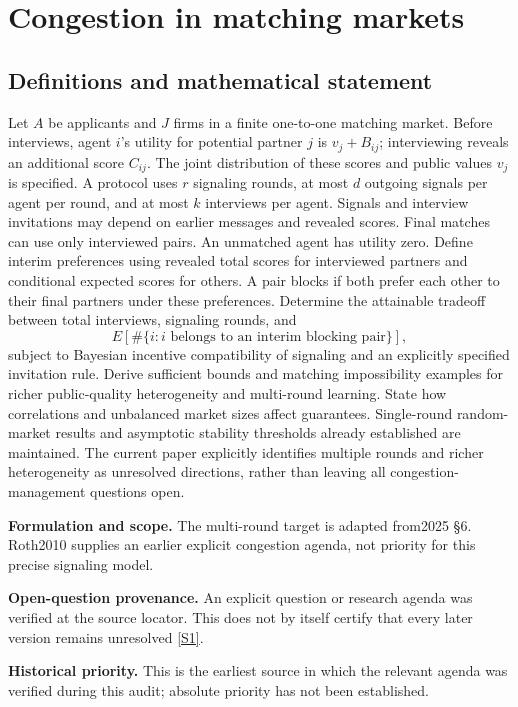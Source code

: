 \documentclass[11pt]{article}
\newcommand{\sref}[2]{\hyperlink{source:#1:#2}{[S#2]}}
\begin{document}
\section*{Congestion in matching markets}\label{30007579}
\subsection{Definitions and mathematical statement}
Let \(A\) be applicants and \(J\) firms in a finite one-to-one matching market. Before interviews, agent \(i\)'s utility for potential partner \(j\) is \(v_j+B_{ij}\); interviewing reveals an additional score \(C_{ij}\). The joint distribution of these scores and public values \(v_j\) is specified. A protocol uses \(r\) signaling rounds, at most \(d\) outgoing signals per agent per round, and at most \(k\) interviews per agent. Signals and interview invitations may depend on earlier messages and revealed scores. Final matches can use only interviewed pairs. An unmatched agent has utility zero. Define interim preferences using revealed total scores for interviewed partners and conditional expected scores for others. A pair blocks if both prefer each other to their final partners under these preferences. Determine the attainable tradeoff between total interviews, signaling rounds, and
\[
 E[\#\{i:i\text{ belongs to an interim blocking pair}\}],
\]
subject to Bayesian incentive compatibility of signaling and an explicitly specified invitation rule. Derive sufficient bounds and matching impossibility examples for richer public-quality heterogeneity and multi-round learning. State how correlations and unbalanced market sizes affect guarantees. Single-round random-market results and asymptotic stability thresholds already established are maintained. The current paper explicitly identifies multiple rounds and richer heterogeneity as unresolved directions, rather than leaving all congestion-management questions open.

\par\textbf{Formulation and scope.} The multi-round target is adapted from2025 §6. Roth2010 supplies an earlier explicit congestion agenda, not priority for this precise signaling model.

\par\textbf{Open-question provenance.} An explicit question or research agenda was verified at the source locator. This does not by itself certify that every later version remains unresolved \sref{30007579}{1}.

\par\textbf{Historical priority.} This is the earliest source in which the relevant agenda was verified during this audit; absolute priority has not been established.
\end{document}
